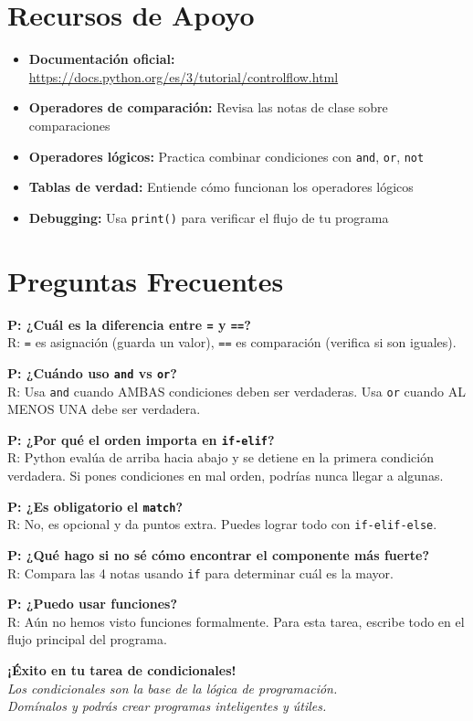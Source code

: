 \documentclass[12pt,a4paper]{article}
\begin{document}
\section{Recursos de Apoyo}

\begin{itemize}[leftmargin=*]
    \item \textbf{Documentación oficial:} \url{https://docs.python.org/es/3/tutorial/controlflow.html}
    \item \textbf{Operadores de comparación:} Revisa las notas de clase sobre comparaciones
    \item \textbf{Operadores lógicos:} Practica combinar condiciones con \texttt{and}, \texttt{or}, \texttt{not}
    \item \textbf{Tablas de verdad:} Entiende cómo funcionan los operadores lógicos
    \item \textbf{Debugging:} Usa \texttt{print()} para verificar el flujo de tu programa
\end{itemize}

\section{Preguntas Frecuentes}

\textbf{P: ¿Cuál es la diferencia entre \texttt{=} y \texttt{==}?}\\
R: \texttt{=} es asignación (guarda un valor), \texttt{==} es comparación (verifica si son iguales).

\textbf{P: ¿Cuándo uso \texttt{and} vs \texttt{or}?}\\
R: Usa \texttt{and} cuando AMBAS condiciones deben ser verdaderas. Usa \texttt{or} cuando AL MENOS UNA debe ser verdadera.

\textbf{P: ¿Por qué el orden importa en \texttt{if-elif}?}\\
R: Python evalúa de arriba hacia abajo y se detiene en la primera condición verdadera. Si pones condiciones en mal orden, podrías nunca llegar a algunas.

\textbf{P: ¿Es obligatorio el \texttt{match}?}\\
R: No, es opcional y da puntos extra. Puedes lograr todo con \texttt{if-elif-else}.

\textbf{P: ¿Qué hago si no sé cómo encontrar el componente más fuerte?}\\
R: Compara las 4 notas usando \texttt{if} para determinar cuál es la mayor.

\textbf{P: ¿Puedo usar funciones?}\\
R: Aún no hemos visto funciones formalmente. Para esta tarea, escribe todo en el flujo principal del programa.

\vspace{1cm}

\begin{center}
\textbf{¡Éxito en tu tarea de condicionales!}\\
\textit{Los condicionales son la base de la lógica de programación.\\
Domínalos y podrás crear programas inteligentes y útiles.}
\end{center}
\end{document}
